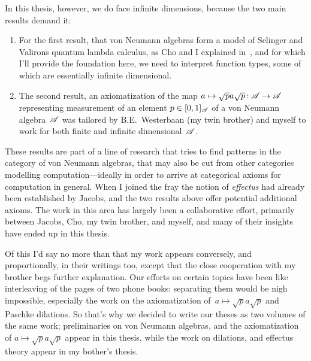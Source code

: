 \documentclass[b5paper]{book}
\begin{document}
\begin{parsec}
\begin{point}
In this thesis, however,
we do face infinite dimensions,
because the two main results demand it:
\begin{enumerate}
\item
For the first result,
that von Neumann algebras
form  a model of Selinger and Valirons quantum lambda calculus,
as Cho and I explained in~,
and for which I'll provide the foundation here,
we need to interpret function types,
some of which are essentially infinite dimensional.
\item
The second result,
an axiomatization
of the map $a\mapsto \sqrt{p}a\sqrt{p}\colon \mathscr{A}\to\mathscr{A}$
representing measurement
of an element $p\in[0,1]_{\mathscr{A}}$
of a von Neumann algebra~$\mathscr{A}$
was tailored by B.E.~Westerbaan (my twin brother) and myself to work for
both finite and infinite dimensional~$\mathscr{A}$.
\end{enumerate}
These results
are part of a line of research that
tries to find patterns
in the category of von Neumann algebras,
that may also be cut from other categories
modelling computation---ideally in order to arrive at categorical axioms
for computation in general.
When I joined the fray
the notion of \emph{effectus} had already
been established by Jacobs,
and the two results
above offer potential additional axioms.
The work in this area has largely been a collaborative effort,
primarily between Jacobs, Cho, my twin brother, and myself,
and many of their insights have ended up in this thesis.

Of this I'd say no more
than that my work appears conversely, and proportionally,
in their writings too, except that the close cooperation
with my brother begs further explanation.
Our efforts on certain topics have been like interleaving 
of the pages of two phone books:
separating them  would be nigh impossible,
especially the work on the axiomatization
of~$a\mapsto \sqrt{p}a\sqrt{p}$ and Paschke dilations.
So that's why we decided to write our theses
as two volumes of the same work;
preliminaries on von Neumann algebras,
and the axiomatization of $a\mapsto \sqrt{p}a\sqrt{p}$
appear in this thesis,
while the work on dilations,
and effectus theory appear in my bother's thesis.


\end{point}
\end{parsec}
\end{document}
